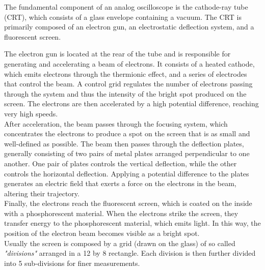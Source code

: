 \documentclass[../main.tex]{subfiles}
\begin{document}
The fundamental component of an analog oscilloscope is the cathode-ray tube (CRT), which consists of a glass envelope containing a vacuum. The CRT is primarily composed of an electron gun, an electrostatic deflection system, and a fluorescent screen.

The electron gun is located at the rear of the tube and is responsible for generating and accelerating a beam of electrons. It consists of a heated cathode, which emits electrons through the thermionic effect, and a series of electrodes that control the beam. A control grid regulates the number of electrons passing through the system and thus the intensity of the bright spot produced on the screen. The electrons are then accelerated by a high potential difference, reaching very high speeds.\\

After acceleration, the beam passes through the focusing system, which concentrates the electrons to produce a spot on the screen that is as small and well-defined as possible. The beam then passes through the deflection plates, generally consisting of two pairs of metal plates arranged perpendicular to one another.
One pair of plates controls the vertical deflection, while the other controls the horizontal deflection. Applying a potential difference to the plates generates an electric field that exerts a force on the electrons in the beam, altering their trajectory.\\

Finally, the electrons reach the fluorescent screen, which is coated on the inside with a phosphorescent material. When the electrons strike the screen, they transfer energy to the phosphorescent material, which emits light. In this way, the position of the electron beam becomes visible as a bright spot.\\

Usually the screen is composed by a grid (drawn on the glass) of so called \textit{"divisions"} arranged in a 12 by 8 rectangle. Each division is then further divided into 5 sub-divisions for finer measurements.\\
\end{document}
